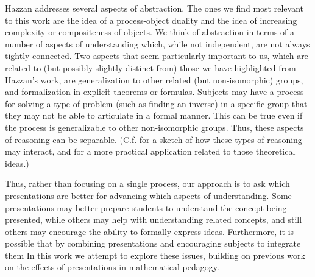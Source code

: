 \documentclass[man,10pt]{apa6}
\begin{document}
Hazzan addresses several aspects of abstraction. The ones we find most relevant to this work are the idea of a process-object duality and the idea of increasing complexity or compositeness of objects. We think of abstraction in terms of a number of aspects of understanding which, while not independent, are not always tightly connected. Two aspects that seem particularly important to us, which are related to (but possibly slightly distinct from) those we have highlighted from Hazzan's work, are generalization to other related (but non-isomorphic) groups, and formalization in explicit theorems or formulas. Subjects may have a process for solving a type of problem (such as finding an inverse) in a specific group that they may not be able to articulate in a formal manner. This can be true even if the process is generalizable to other non-isomorphic groups. Thus, these aspects of reasoning can be separable. (C.f.  for a sketch of how these types of reasoning may interact, and \cite{Leron1995} for a more practical application related to those theoretical ideas.) \par
Thus, rather than focusing on a single process, our approach is to ask which presentations are better for advancing which aspects of understanding. Some presentations may better prepare students to understand the concept being presented, while others may help with understanding related concepts, and still others may encourage the ability to formally express ideas. Furthermore, it is possible that by combining presentations and encouraging subjects to integrate them In this work we attempt to explore these issues, building on previous work on the effects of presentations in mathematical pedagogy. 
\end{document}
